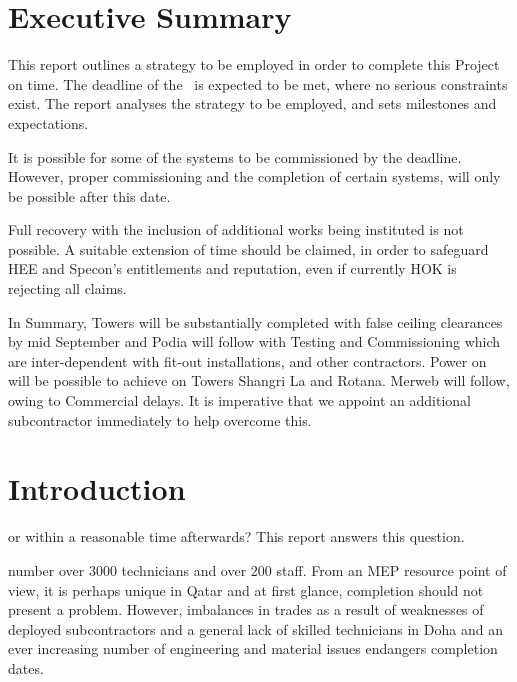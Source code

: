 
\cleardoublepage

\chapter*{Executive Summary}


This report outlines a strategy to be employed in order to complete this Project on time. The deadline of the {\protect\deadline}~is expected to be met, where no serious constraints exist. The report analyses the strategy to be employed, and sets milestones and expectations. 

It is possible for some of the systems to be commissioned by the deadline. However, proper commissioning and the completion of certain systems, will only be possible after this date. 

Full recovery with the inclusion of additional works being instituted is not possible. A suitable extension of time should be claimed, in order to safeguard HEE and Specon's entitlements and reputation, even if currently HOK is rejecting all claims. 

In Summary, Towers will be substantially completed with false ceiling clearances by mid September and Podia will follow with Testing and Commissioning which are inter-dependent with fit-out installations, and other contractors. Power on will be possible to achieve on Towers Shangri La and Rotana. Merweb will follow, owing to Commercial delays. It is imperative that we appoint an additional subcontractor immediately to help overcome this.



\chapter{Introduction}
\label{ch:the-problem}

 or within a reasonable time afterwards? 
This report answers this question.

 number over 3000 technicians and over 200 staff. From an MEP resource point of view, it is perhaps unique in Qatar and at first glance, completion should not present a problem. However, imbalances in trades as a result of weaknesses of deployed subcontractors and a general lack of skilled technicians in Doha and an ever increasing number of engineering and material issues endangers completion dates.


